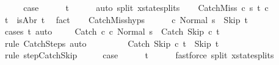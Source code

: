 \begin{isabellebody}
\ \ \isamarkupfalse%
\ \isamarkupfalse%
\ {\isacharquery}case\isanewline
\ \ \ \ \isamarkupfalse%
\ t\isanewline
\ \ \ \ \isamarkupfalse%
\ {\isacharparenleft}auto\ split{\isacharcolon}\ xstate{\isachardot}splits{\isacharparenright}\isanewline
{}\isamarkupfalse%
\isanewline
\ \ \isamarkupfalse%
\ {\isacharparenleft}CatchMiss\ c\ s\ t\ c\ \isanewline
\ \ \isamarkupfalse%
\ t{\isacharcolon}\ {\isachardoublequoteopen}{\isasymnot}\ isAbr\ t{\isachardoublequoteclose}\ \isamarkupfalse%
\ fact\isanewline
\ \ \isamarkupfalse%
\ CatchMiss{\isachardot}hyps\ {\isacharparenleft}{}{\isacharparenright}\isanewline
\ \ \isamarkupfalse%
\ {\isachardoublequoteopen}{\isasymGamma}{\isasymturnstile}\ {\isacharparenleft}c\ Normal\ s{\isacharparenright}\ {\isasymrightarrow}\isactrlsup {\isacharasterisk}\ {\isacharparenleft}Skip{\isacharcomma}\ t{\isacharparenright}{\isachardoublequoteclose}\isanewline
\ \ \ \ \isamarkupfalse%
\ {\isacharparenleft}cases\ t{\isacharparenright}\ auto\isanewline
\ \ \isamarkupfalse%
\ {\isachardoublequoteopen}{\isasymGamma}{\isasymturnstile}\ {\isacharparenleft}Catch\ c\ c\ Normal\ s{\isacharparenright}\ {\isasymrightarrow}\isactrlsup {\isacharasterisk}\ {\isacharparenleft}Catch\ Skip\ c\ t{\isacharparenright}{\isachardoublequoteclose}\isanewline
\ \ \ \ \isamarkupfalse%
\ {\isacharparenleft}rule\ CatchSteps{\isacharparenright}\ auto\isanewline
\ \ \isamarkupfalse%
\ \isanewline
\ \ \isamarkupfalse%
\ {\isachardoublequoteopen}{\isasymGamma}{\isasymturnstile}\ {\isacharparenleft}Catch\ Skip\ c\ t{\isacharparenright}\ {\isasymrightarrow}\ {\isacharparenleft}Skip{\isacharcomma}\ t{\isacharparenright}{\isachardoublequoteclose}\isanewline
\ \ \ \ \isamarkupfalse%
\ {\isacharparenleft}rule\ step{\isachardot}CatchSkip{\isacharparenright}\isanewline
\ \ \isamarkupfalse%
\ \isamarkupfalse%
\ {\isacharquery}case\isanewline
\ \ \ \ \isamarkupfalse%
\ t\isanewline
\ \ \ \ \isamarkupfalse%
\ {\isacharparenleft}fastforce\ split{\isacharcolon}\ xstate{\isachardot}splits{\isacharparenright}\isanewline

\end{isabellebody}
